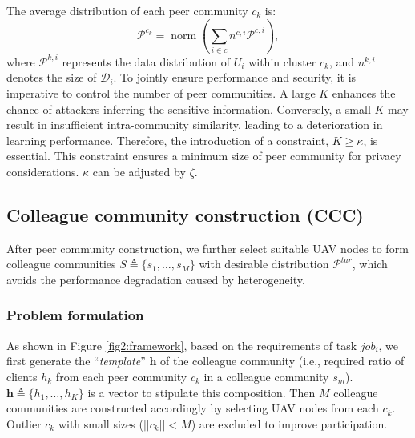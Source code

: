 \documentclass[lettersize,journal]{IEEEtran}
\begin{document}
The average distribution of each peer community $c_k$ is:
\begin{equation}
    	 \mathcal{P}^{c_k}=\operatorname{norm}\left(\sum_{i \in c} n^{c,i} \mathcal{P}^{c,i} \right),
\end{equation}
where $\mathcal{P}^{k,i}$ represents the data distribution of $U_i$ within cluster $c_k$, and $n^{k,i}$ denotes the size of $\mathcal{D}_i$. 
To jointly ensure performance and security, it is imperative to control the number of peer communities. A large $K$ enhances the chance of attackers inferring the sensitive information. Conversely, a small $K$ may result in insufficient intra-community similarity, leading to a deterioration in learning performance. Therefore, the introduction of a constraint, $K \geq \kappa$, is essential. This constraint ensures a minimum size of peer community for privacy considerations. $\kappa$ can be adjusted by $\zeta$.

\subsection{Colleague community construction (CCC)}
After peer community construction, we further select suitable UAV nodes to form colleague communities $S\triangleq\{s_1, \ldots, s_{M}\}$ with desirable distribution $\mathcal{P}^{tar}$, which avoids the performance degradation caused by heterogeneity. 

\subsubsection{Problem formulation}
As shown in Figure \ref{fig2:framework}, based on the requirements of task $job_i$, we first generate the ``\textit{template}'' $\mathbf{h}$ of the colleague community (i.e., required ratio of clients $h_k$ from each peer community $c_k$ in a colleague community $s_{m}$). $\mathbf{h}\triangleq\{h_{1}, \ldots, h_{K}\}$ is a vector to stipulate this composition. Then $M$ colleague communities are constructed accordingly by selecting UAV nodes from each $c_k$. Outlier $c_k$ with small sizes ($\vert\vert c_k\vert\vert< M$) are excluded to improve participation.
\end{document}
